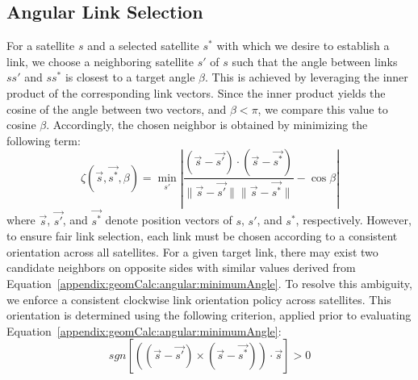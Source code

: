 \documentclass[acmsmall, screen]{acmart}
\begin{document}
\subsection{Angular Link Selection}\label{appendix:geomCalc:angular}
For a satellite $s$ and a selected satellite $s^*$ with which we desire to establish a link, we choose a neighboring satellite $s'$ of $s$ such that the angle between links $ss'$ and $ss^*$ is closest to a target angle $\beta$. This is achieved by leveraging the inner product of the corresponding link vectors. Since the inner product yields the cosine of the angle between two vectors, and $\beta < \pi$, we compare this value to cosine ${\beta}$. Accordingly, the chosen neighbor is obtained by minimizing the following term: 
\begin{equation}\label{appendix:geomCalc:angular:minimumAngle}
    \zeta(\vec{s}, \vec{s^*}, \beta) = \min_{s'} \left|\frac{(\vec{s} - \vec{s'}) \cdot (\vec{s} - \vec{s^*})}{\|\vec{s} - \vec{s'}\|\|\vec{s} - \vec{s^*}\|} - \cos{\beta} \right|
\end{equation}
where $\vec{s}$, $\vec{s'}$, and $\vec{s^*}$ denote position vectors of $s$, $s'$, and $s^*$, respectively. However, to ensure fair link selection, each link must be chosen according to a consistent orientation across all satellites. For a given target link, there may exist two candidate neighbors on opposite sides with similar values derived from Equation~\ref{appendix:geomCalc:angular:minimumAngle}. To resolve this ambiguity, we enforce a consistent clockwise link orientation policy across satellites. This orientation is determined using the following criterion, applied prior to evaluating Equation~\ref{appendix:geomCalc:angular:minimumAngle}:
\begin{equation}\label{appendix:geomCalc:angular:orientationCriterion}
    sgn\left[\left((\vec{s} - \vec{s'}) \times (\vec{s} - \vec{s^*})\right) \cdot \vec{s} \right] > 0
\end{equation}
\end{document}
